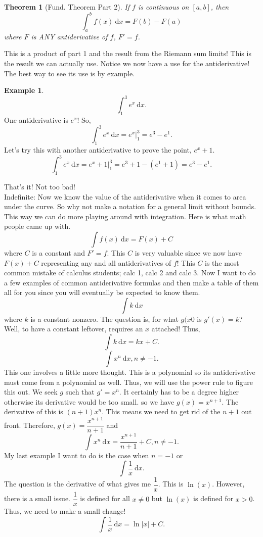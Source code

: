 \documentclass[10pt]{article}
\newcommand{\dx}{\:\mathrm{d}x}
\theoremstyle{Theorem}
\newtheorem{theorem}{Theorem}[section]
\theoremstyle{definition}
\newtheorem{ex}{Example}[section]
\theoremstyle{remark}
\theoremstyle{custom}
\begin{document}
\begin{theorem}[Fund. Theorem Part 2]
If $f$ is continuous on $[a,b]$, then 
\[
\int_a^bf(x)\dx = F(b)-F(a)
\]
where $F$ is ANY antiderivative of $f$, $F'=f$.
\end{theorem}
This is a product of part 1 and the result from the Riemann sum limits! This is the result we can actually use. Notice we now have a use for the antiderivative! The best way to see its use is by example.
\begin{ex}
\[
\int_1^3e^x\dx.
\]
One antiderivative is $e^x$! So, 
\[
\int_1^3e^x\dx=e^x\Bigg |^3_1=e^3-e^1.
\]
Let's try this with another antiderivative to prove the point, $e^x+1$.
\[
\int_1^3e^x\dx=e^x+1\Bigg |^3_1=e^3+1-(e^1+1)=e^3-e^1.
\]
\end{ex}
That's it! Not too bad!\\
Indefinite: Now we know the value of the antiderivative when it comes to area under the curve. So why not make a notation for a general limit without bounds. This way we can do more playing around with integration. Here is what math people came up with.
\[
\int f(x)\dx=F(x)+C
\]
where $C$ is a constant and $F'=f$.  This $C$ is very valuable since we now have $F(x)+C$ representing any and all antiderivatives of $f$! This $C$ is the most common mistake of calculus students; calc 1, calc 2 and calc 3.  Now I want to do a few examples of common antiderivative formulas and then make a table of them all for you since you will eventually be expected to know them.
\[
\int k \dx
\]
where $k$ is a constant nonzero. The question is, for what $g(x0$ is $g'(x)=k$? Well, to have a constant leftover, requires an $x$ attached! Thus,
\[
\int k \dx=kx+C.
\]
\[
\int x^n \dx, n \neq -1.
\]
This one involves a little more thought. This is a polynomial so its antiderivative must come from a polynomial as well. Thus, we will use the power rule to figure this out. We seek $g$ such that $g'=x^n$. It certainly has to be a degree higher otherwise its derivative would be too small. so we have $g(x)=x^{n+1}$. The derivative of this is $(n+1)x^n$. This means we need to get rid of the $n+1$ out front. Therefore,  $g(x)=\dfrac{x^{n+1}}{n+1}$ and 
\[
\int x^n \dx = \dfrac{x^{n+1}}{n+1}+C, n \neq -1.
\]
My last example I want to do is the case when $n=-1$ or 
\[
\int\dfrac{1}{x}\dx.
\]
The question is the derivative of what gives me $\dfrac{1}{x}$. This is $\ln(x)$. However, there is a small issue. $\dfrac{1}{x}$ is defined for all $x\neq 0$ but $\ln(x)$ is defined for $x>0$. Thus, we need to make a small change! 
\[
\int\dfrac{1}{x}\dx=\ln|x|+C.
\]
\end{document}
